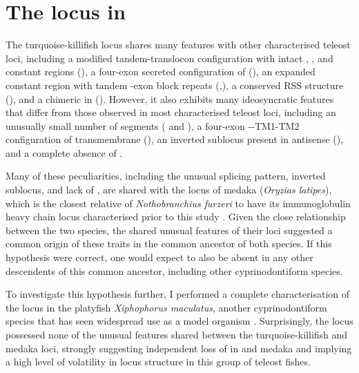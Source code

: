 \FloatBarrier
\clearpage

\section{The \igh{} locus in \xma}
\label{sec:xma-locus}
	
	The turquoise-killifish \igh{} locus shares many features with other characterised teleost loci, including a modified tandem-translocon configuration with intact \vh, \dh, \jh and constant regions (), a four-exon secreted configuration of  (), an expanded  constant region with tandem \cd{}-exon block repeats (,), a conserved RSS structure (), and a chimeric  in  (). However, it also exhibits many ideosyncratic features that differ from those observed in most characterised teleost loci, including an unusually small number of \vh segments ( and ), a four-exon --TM1-TM2 configuration of transmembrane  (), an inverted sublocus present in antisense (), and a complete absence of .
	
Many of these peculiarities, including the unusual  splicing pattern, inverted sublocus, and lack of , are shared with the \igh{} locus of medaka (\textit{Oryzias latipes}), which is the closest relative of \textit{Nothobranchius furzeri} to have its immunoglobulin heavy chain locus characterised prior to this study \parencite{magadan2011medaka}. Given the close relationship between the two species, the shared unusual features of their \igh{} loci suggested a common origin of these traits  in the common ancestor of both species. If this hypothesis were correct, one would expect  to also be absent in any other descendents of this common ancestor, including other cyprinodontiform species.

To investigate this hypothesis further, I performed a complete characterisation of the \igh{} locus in the platyfish \textit{Xiphophorus maculatus}, another cyprinodontiform species that has seen widespread use as a model organism \parencite{schartl2013platyfish}. Surprisingly, the \Xma locus possessed none of the unusual features shared between the turquoise-killifish and medaka loci, strongly suggesting independent loss of  in \Nfu and medaka and implying a high level of volatility in \igh{} locus structure in this group of teleost fishes.

